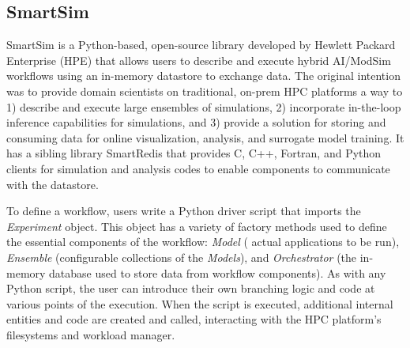 \documentclass[sigconf]{acmart}
\begin{document}



\subsection{SmartSim}
\label{sec:smartsim}

SmartSim is a Python-based, open-source library developed by Hewlett Packard Enterprise (HPE) that allows users to describe and execute hybrid AI/ModSim workflows using an in-memory datastore to exchange data. The original intention was to provide domain scientists on traditional, on-prem HPC platforms a way to 1)  describe and execute large ensembles of simulations, 2) incorporate in-the-loop inference capabilities for simulations, and 3) provide a solution for storing and consuming data for online visualization, analysis, and surrogate model training. It has a sibling library SmartRedis that provides C, C++, Fortran, and Python clients for simulation and analysis codes to enable components to communicate with the datastore.

To define a workflow, users write a Python driver script that imports the \textit{Experiment} object. This object has a variety of factory methods used to define the essential components of the workflow: \textit{Model} ( actual applications to be run), \textit{Ensemble} (configurable collections of the \textit{Models}), and \textit{Orchestrator} (the in-memory database used to store data from workflow components). As with any Python script, the user can introduce their own branching logic and code at various points of the execution. When the script is executed, additional internal entities and code are created and called, interacting with the HPC platform's filesystems and workload manager.
\end{document}
